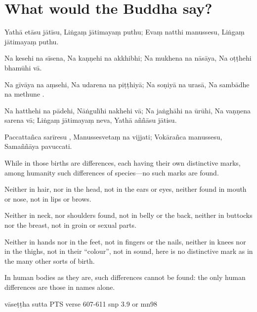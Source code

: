\section{What would the Buddha say?}


Yathā etāsu jātīsu,
Liṅgaṃ jātimayaṃ puthu;
Evaṃ natthi manussesu,
Liṅgaṃ jātimayaṃ puthu.

Na kesehi na sīsena,
Na kaṇṇehi na akkhibhi;
Na mukhena na nāsāya,
Na oṭṭhehi bhamūhi vā.

Na gīvāya na aṃsehi,
Na udarena na piṭṭhiyā;
Na soṇiyā na urasā,
Na sambādhe na methune .

Na hatthehi na pādehi,
Nāṅgulīhi nakhehi vā;
Na jaṅghāhi na ūrūhi,
Na vaṇṇena sarena vā;
Liṅgaṃ jātimayaṃ neva,
Yathā aññāsu jātisu.

Paccattañca sarīresu ,
Manussesvetaṃ na vijjati;
Vokārañca manussesu,
Samaññāya pavuccati.




While in those births are differences,
each having their own distinctive marks,
among humanity such differences
of species—no such marks are found.

Neither in hair, nor in the head,
not in the ears or eyes,
neither found in mouth or nose,
not in lips or brows.

Neither in neck, nor shoulders found,
not in belly or the back,
neither in buttocks nor the breast,
not in groin or sexual parts.

Neither in hands nor in the feet,
not in fingers or the nails,
neither in knees nor in the thighs,
not in their “colour”, not in sound,
here is no distinctive mark
as in the many other sorts of birth.

In human bodies as they are,
such differences cannot be found:
the only human differences
are those in names alone.

vāseṭṭha sutta
PTS verse 607-611
snp 3.9 or mn98
